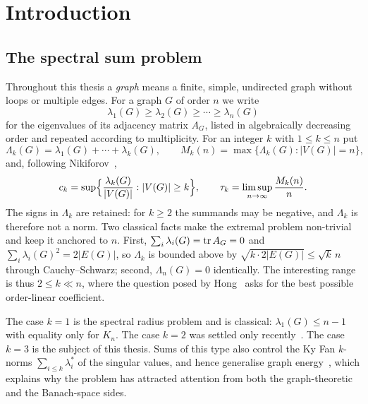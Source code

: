 \chapter{Introduction}\label{ch-intro}

\section{The spectral sum problem}\label{sec-problem}
Throughout this thesis a \emph{graph} means a finite, simple, undirected graph
without loops or multiple edges. For a graph $G$ of order $n$ we write
\[
 \lambda_1(G)\ge\lambda_2(G)\ge\cdots\ge\lambda_n(G)
\]
for the eigenvalues of its adjacency matrix $A_G$, listed in algebraically
decreasing order and repeated according to multiplicity. For an integer
$k$ with $1\le k\le n$ put
\[
 \Lambda_k(G)=\lambda_1(G)+\cdots+\lambda_k(G),
 \qquad
 M_k(n)=\max\{\Lambda_k(G):|V(G)|=n\},
\]
and, following Nikiforov~\cite{Nik15},
\[
 c_k=\sup\Bigl\{\frac{\lambda_k(G)}{|V(G)|}:|V(G)|\ge k\Bigr\},
 \qquad
 \tau_k=\limsup_{n\to\infty}\frac{M_k(n)}n .
\]
The signs in $\Lambda_k$ are retained: for $k\ge2$ the summands may be
negative, and $\Lambda_k$ is therefore not a norm. Two classical facts make
the extremal problem non-trivial and keep it anchored to $n$. First,
$\sum_i\lambda_i(G)=\operatorname{tr} A_G=0$ and $\sum_i\lambda_i(G)^2=2|E(G)|$, so
$\Lambda_k$ is bounded above by $\sqrt{k\cdot 2|E(G)|}\le\sqrt{k}\,n$ through
Cauchy--Schwarz; second, $\Lambda_n(G)=0$ identically. The interesting range
is thus $2\le k\ll n$, where the question posed by Hong~\cite{Hong93} asks
for the best possible order-linear coefficient.

The case $k=1$ is the spectral radius problem and is classical:
$\lambda_1(G)\le n-1$ with equality only for $K_n$. The case $k=2$ was
settled only recently~\cite{KLMPT,HW}. The case $k=3$ is the subject of this
thesis. Sums of this type also control the Ky Fan $k$-norms
$\sum_{i\le k}\lambda_i^\ast$ of the singular values, and hence generalise
graph energy~\cite{Nik15}, which explains why the problem has attracted
attention from both the graph-theoretic and the Banach-space sides.

